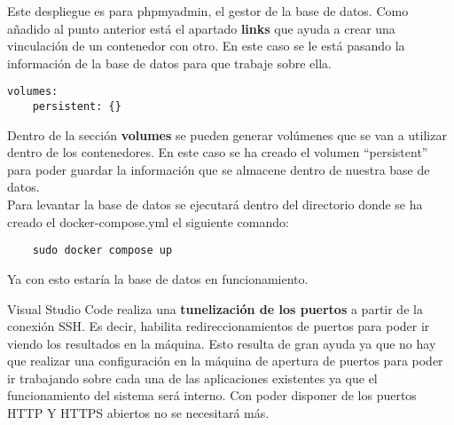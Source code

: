 Este despliegue es para phpmyadmin, el gestor de la base de datos. Como añadido al punto anterior está el apartado \textbf{links} que ayuda a crear una vinculación de un contenedor con otro. En este caso se le está pasando la información de la base de datos para que trabaje sobre ella.
\begin{verbatim}
volumes:
    persistent: {}
\end{verbatim}
Dentro de la sección \textbf{volumes} se pueden generar volúmenes que se van a utilizar dentro de los contenedores. En este caso se ha creado el volumen ``persistent'' para poder guardar la información que se almacene dentro de nuestra base de datos.
\vspace{\baselineskip}
\\Para levantar la base de datos se ejecutará dentro del directorio donde se ha creado el docker-compose.yml el siguiente comando:
\begin{verbatim}
    sudo docker compose up
\end{verbatim}
Ya con esto estaría la base de datos en funcionamiento.
\vspace{\baselineskip}
\begin{tcolorbox}
  [colback=green!5!white,colframe=green!75!black,fonttitle=\bfseries,title=¿Cómo comprobamos los resultados?]
  Visual Studio Code realiza una \textbf{tunelización de los puertos} a partir de la conexión SSH. Es decir, habilita redireccionamientos de puertos para poder ir viendo los resultados en la máquina. Esto resulta de gran ayuda ya que no hay que realizar una configuración en la máquina de apertura de puertos para poder ir trabajando sobre cada una de las aplicaciones existentes ya que el funcionamiento del sistema será interno. Con poder disponer de los puertos HTTP Y HTTPS abiertos no se necesitará más.
\end{tcolorbox}

